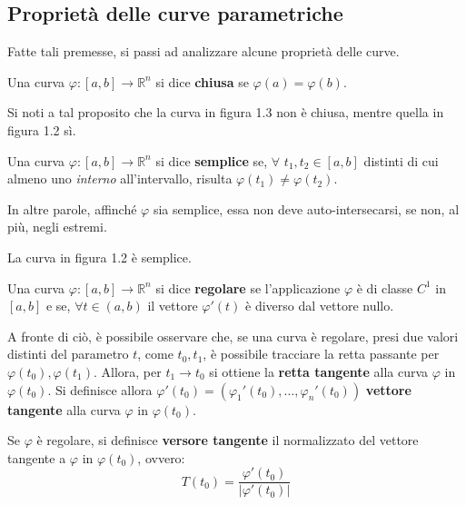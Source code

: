 \subsection{Proprietà delle curve parametriche}
Fatte tali premesse, si passi ad analizzare alcune proprietà delle curve.
\begin{definition}
    Una curva $\varphi:[a,b]\to\mathbb{R}^n$ si dice \textbf{chiusa} se $\varphi(a)=\varphi(b)$.
\end{definition}
\begin{oss}
    Si noti a tal proposito che la curva in figura 1.3 non è chiusa, mentre quella in figura 1.2 sì.
\end{oss}
\begin{definition}
    Una curva $\varphi:[a,b] \to \mathbb{R}^n$ si dice \textbf{semplice} se, $\forall$ $ t_1, t_2 \in [a,b]$ distinti di cui almeno uno \textit{interno} all'intervallo, risulta $\varphi(t_1)\neq\varphi(t_2)$.
\end{definition}
    \begin{oss}
        In altre parole, affinché $\varphi$ sia semplice, essa non deve auto-intersecarsi, se non, al più, negli estremi.
    \end{oss}
    \begin{oss}
        La curva in figura 1.2 è semplice.
    \end{oss}
\begin{definition}
    Una curva $\varphi:[a,b] \to \mathbb{R}^n$ si dice \textbf{regolare} se l'applicazione $\varphi$ è di classe $C^1$ in $[a,b]$ e se, $\forall t \in (a,b)$ il vettore $\varphi'(t)$ è diverso dal vettore nullo.
\end{definition}
A fronte di ciò, è possibile osservare che, se una curva è regolare, presi due valori distinti del parametro $t$, come $t_0, t_1$, è possibile tracciare la retta passante per $\varphi(t_0), \varphi(t_1)$. Allora, per $t_1 \to t_0$ si ottiene la \textbf{retta tangente} alla curva $\varphi$ in $\varphi(t_0)$.
Si definisce allora $\varphi'(t_0)=(\varphi_1'(t_0), \dots, \varphi_n'(t_0))$ \textbf{vettore tangente} alla curva $\varphi$ in $\varphi(t_0)$.
\begin{definition}
    Se $\varphi$ è regolare, si definisce \textbf{versore tangente} il normalizzato del vettore tangente a $\varphi$ in $\varphi(t_0)$, ovvero:
    \begin{equation}
        T(t_0)=\frac{\varphi'(t_0)}{|\varphi'(t_0)|}
    \end{equation}
\end{definition}
